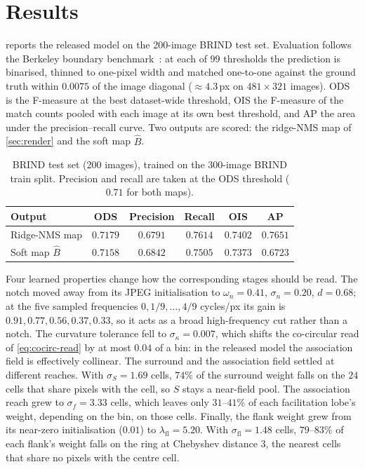 \documentclass[11pt,a4paper]{article}
\begin{document}
\section{Results}\label{sec:results}

 reports the released model on the 200-image BRIND test set. Evaluation follows the Berkeley boundary benchmark~\cite{arbelaez2011gpb}: at each of $99$ thresholds the prediction is binarised, thinned to one-pixel width and matched one-to-one against the ground truth within $0.0075$ of the image diagonal ($\approx 4.3$\,px on $481 \times 321$ images). ODS is the F-measure at the best dataset-wide threshold, OIS the F-measure of the match counts pooled with each image at its own best threshold, and AP the area under the precision--recall curve. Two outputs are scored: the ridge-NMS map of \cref{sec:render} and the soft map $\hat B$.

\begin{table}[h]
\centering
\caption{BRIND test set (200 images), trained on the 300-image BRIND train split. Precision and recall are taken at the ODS threshold ($0.71$ for both maps).}
\label{tab:brind}
\renewcommand{\arraystretch}{1.15}
\begin{tabular}{lccccc}
\toprule
Output & ODS & Precision & Recall & OIS & AP \\
\midrule
Ridge-NMS map & $0.7179$ & $0.6791$ & $0.7614$ & $0.7402$ & $0.7651$ \\
Soft map $\hat B$ & $0.7158$ & $0.6842$ & $0.7505$ & $0.7373$ & $0.6723$ \\
\bottomrule
\end{tabular}
\end{table}

Four learned properties change how the corresponding stages should be read. The notch moved away from its JPEG initialisation to $\omega_n = 0.41$, $\sigma_n = 0.20$, $d = 0.68$; at the five sampled frequencies $0, 1/9, \dots, 4/9$ cycles/px its gain is $0.91, 0.77, 0.56, 0.37, 0.33$, so it acts as a broad high-frequency cut rather than a notch. The curvature tolerance fell to $\sigma_\kappa = 0.007$, which shifts the co-circular read of \cref{eq:cocirc-read} by at most $0.04$ of a bin: in the released model the association field is effectively collinear. The surround and the association field settled at different reaches. With $\sigma_S = 1.69$ cells, $74\%$ of the surround weight falls on the $24$ cells that share pixels with the cell, so $S$ stays a near-field pool. The association reach grew to $\sigma_f = 3.33$ cells, which leaves only $31$--$41\%$ of each facilitation lobe's weight, depending on the bin, on those cells. Finally, the flank weight grew from its near-zero initialisation ($0.01$) to $\lambda_{\mathrm{fl}} = 5.20$. With $\sigma_{\mathrm{fl}} = 1.48$ cells, $79$--$83\%$ of each flank's weight falls on the ring at Chebyshev distance $3$, the nearest cells that share no pixels with the centre cell.
\end{document}
